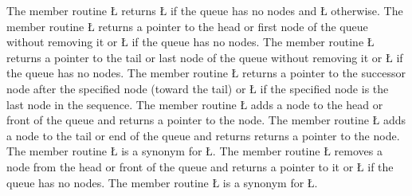 \documentclass[openright,twoside]{report}
\begin{document}
The member routine \LGinlinetrue\LGbegin\lgrinde\L{}\endlgrinde\LGend{} returns \LGinlinetrue\LGbegin\lgrinde\L{}\endlgrinde\LGend{} if the queue has no nodes and \LGinlinetrue\LGbegin\lgrinde\L{}\endlgrinde\LGend{} otherwise.
The member routine \LGinlinetrue\LGbegin\lgrinde\L{}\endlgrinde\LGend{} returns a pointer to the head or first node of the queue without removing it or \LGinlinetrue\LGbegin\lgrinde\L{}\endlgrinde\LGend{} if the queue has no nodes.
The member routine \LGinlinetrue\LGbegin\lgrinde\L{}\endlgrinde\LGend{} returns a pointer to the tail or last node of the queue without removing it or \LGinlinetrue\LGbegin\lgrinde\L{}\endlgrinde\LGend{} if the queue has no nodes.
The member routine \LGinlinetrue\LGbegin\lgrinde\L{}\endlgrinde\LGend{} returns a pointer to the successor node after the specified node (toward the tail) or \LGinlinetrue\LGbegin\lgrinde\L{}\endlgrinde\LGend{} if the specified node is the last node in the sequence.
The member routine \LGinlinetrue\LGbegin\lgrinde\L{}\endlgrinde\LGend{} adds a node to the head or front of the queue and returns a pointer to the node.
The member routine \LGinlinetrue\LGbegin\lgrinde\L{}\endlgrinde\LGend{} adds a node to the tail or end of the queue and returns returns a pointer to the node.
The member routine \LGinlinetrue\LGbegin\lgrinde\L{}\endlgrinde\LGend{} is a synonym for \LGinlinetrue\LGbegin\lgrinde\L{}\endlgrinde\LGend{}.
The member routine \LGinlinetrue\LGbegin\lgrinde\L{}\endlgrinde\LGend{} removes a node from the head or front of the queue and returns a pointer to it or \LGinlinetrue\LGbegin\lgrinde\L{}\endlgrinde\LGend{} if the queue has no nodes.
The member routine \LGinlinetrue\LGbegin\lgrinde\L{}\endlgrinde\LGend{} is a synonym for \LGinlinetrue\LGbegin\lgrinde\L{}\endlgrinde\LGend{}.
\end{document}
